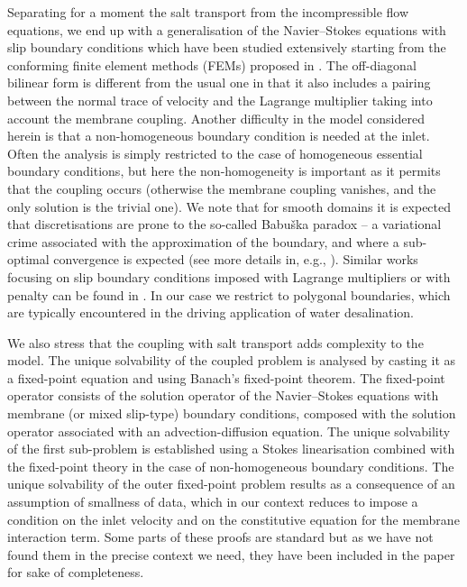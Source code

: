 \documentclass[onefignum,onetabnum,reqno,a4paper,final]{siamart250211}
\newcommand\0{\mathbf{0}}
\numberwithin{figure}{section}
\numberwithin{table}{section}
\begin{document}
Separating for a moment the salt transport from the incompressible flow equations, we end up with a generalisation of the Navier--Stokes equations with slip boundary conditions which have been studied extensively starting from the conforming finite element methods (FEMs) proposed in \cite{verfurth86,verfurth91}. The off-diagonal bilinear form is different from the usual one in that it also includes a pairing between the normal trace of velocity and the Lagrange multiplier taking into account the membrane coupling. Another difficulty in the model considered herein is that a non-homogeneous boundary condition is needed at the inlet. Often the analysis is simply restricted to the case of homogeneous essential boundary conditions, but here the non-homogeneity is important as it permits that the coupling occurs (otherwise the membrane coupling vanishes, and the only solution is the trivial one). 
	We note that for smooth domains it is expected that discretisations are prone to the so-called Babu\v{s}ka paradox -- a variational crime associated with the approximation of the boundary, and where a sub-optimal convergence is expected (see more details in, e.g., \cite{kashiwabara2016penalty,urquiza2014weak}). Similar works focusing on slip boundary conditions imposed with Lagrange multipliers or with penalty can be found in \cite{liakos2001discretization,layton1999weak,zhou2016penalty}. In our case we restrict to polygonal boundaries, which are typically  encountered in the driving application of water desalination. 
	
We also stress that the coupling with salt transport adds complexity to the model. The unique solvability of the coupled problem is analysed by casting it as a fixed-point equation and using Banach's fixed-point theorem. The fixed-point operator consists of the solution operator of the Navier--Stokes equations with membrane (or mixed slip-type) boundary conditions, composed with the solution operator associated with an advection-diffusion equation. The unique solvability of the first sub-problem is established   using a Stokes linearisation combined with the fixed-point theory in the case of non-homogeneous boundary conditions. The unique solvability of the outer fixed-point problem results as a consequence of an assumption of smallness of data, which in our context reduces to impose a condition on the inlet velocity and on the  constitutive equation for the membrane interaction term. Some parts of these proofs are standard but as we have not found them in the precise context we need, they have been included in the paper for sake of completeness. 
\end{document}
